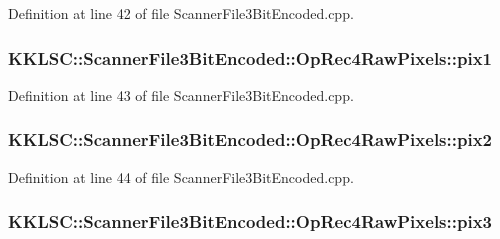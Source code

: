 Definition at line 42 of file Scanner\+File3\+Bit\+Encoded.\+cpp.

\subsubsection[{\texorpdfstring{pix1}{pix1}}]{ K\+K\+L\+S\+C\+::\+Scanner\+File3\+Bit\+Encoded\+::\+Op\+Rec4\+Raw\+Pixels\+::pix1}\hypertarget{struct_scanner_file3_bit_encoded_1_1_op_rec4_raw_pixels_aa38b3af2bb49373baa63cc8c232bd5e7}{}\label{struct_scanner_file3_bit_encoded_1_1_op_rec4_raw_pixels_aa38b3af2bb49373baa63cc8c232bd5e7}


Definition at line 43 of file Scanner\+File3\+Bit\+Encoded.\+cpp.

\subsubsection[{\texorpdfstring{pix2}{pix2}}]{ K\+K\+L\+S\+C\+::\+Scanner\+File3\+Bit\+Encoded\+::\+Op\+Rec4\+Raw\+Pixels\+::pix2}\hypertarget{struct_scanner_file3_bit_encoded_1_1_op_rec4_raw_pixels_a1b012bd865aa55b188f411ab134e7cc6}{}\label{struct_scanner_file3_bit_encoded_1_1_op_rec4_raw_pixels_a1b012bd865aa55b188f411ab134e7cc6}


Definition at line 44 of file Scanner\+File3\+Bit\+Encoded.\+cpp.

\subsubsection[{\texorpdfstring{pix3}{pix3}}]{ K\+K\+L\+S\+C\+::\+Scanner\+File3\+Bit\+Encoded\+::\+Op\+Rec4\+Raw\+Pixels\+::pix3}\hypertarget{struct_scanner_file3_bit_encoded_1_1_op_rec4_raw_pixels_a522755d99e7d23510ab674d3c495eb1a}{}\label{struct_scanner_file3_bit_encoded_1_1_op_rec4_raw_pixels_a522755d99e7d23510ab674d3c495eb1a}



